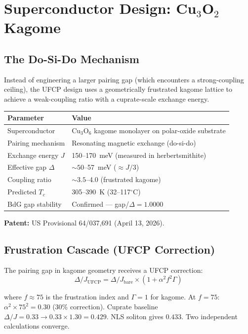 \documentclass[11pt, a4paper]{article}
\begin{document}
\section{Superconductor Design: Cu$_3$O$_2$ Kagome}

\subsection{The Do-Si-Do Mechanism}

Instead of engineering a larger pairing gap (which encounters a
strong-coupling ceiling), the UFCP design uses a geometrically
frustrated kagome lattice to achieve a weak-coupling ratio with
a cuprate-scale exchange energy.

\begin{center}
\begin{tabular}{@{}ll@{}}
\toprule
\textbf{Parameter} & \textbf{Value} \\
\midrule
Superconductor & Cu$_3$O$_6$ kagome monolayer on polar-oxide substrate \\
Pairing mechanism & Resonating magnetic exchange (do-si-do) \\
Exchange energy $J$ & 150--170~meV (measured in herbertsmithite) \\
Effective gap $\Delta$ & $\sim 50$--57~meV ($\approx J/3$) \\
Coupling ratio & $\sim 3.5$--4.0 (frustrated kagome) \\
Predicted $T_c$ & 305--390~K (32--117$^\circ$C) \\
BdG gap stability & Confirmed --- gap/$\Delta = 1.0000$ \\
\bottomrule
\end{tabular}
\end{center}

\textbf{Patent:} US Provisional 64/037,691 (April 13, 2026).

\subsection{Frustration Cascade (UFCP Correction)}

The pairing gap in kagome geometry receives a UFCP correction:
\begin{equation}
  \Delta/J_{\text{UFCP}} = \Delta/J_{\text{bare}}
  \times (1 + \alpha^2 f^2 \Gamma)
\end{equation}

where $f \approx 75$ is the frustration index and $\Gamma = 1$ for
kagome. At $f = 75$: $\alpha^2 \times 75^2 = 0.30$ (30\% correction).
Cuprate baseline $\Delta/J = 0.33 \to 0.33 \times 1.30 = 0.429$.
NLS soliton gives $0.433$. Two independent calculations converge.
\end{document}

